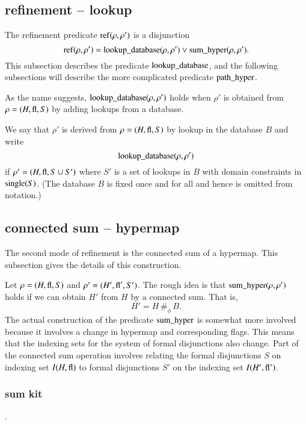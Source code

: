 \subsection{refinement -- lookup}
%
\label{sec:refine}

The refinement predicate ${\operatorname{ref}}(\rho,\rho')$ is a disjunction
    \begin{equation}
    {\operatorname{ref}}(\rho,\rho') =
    {\operatorname{lookup\_database}}(\rho,\rho')\vee
    {\operatorname{sum\_hyper}}(\rho,\rho').
    \end{equation}
This subsection describes the predicate ${\operatorname{lookup\_database}}$,
and the following subsections  will describe the more complicated
predicate ${\operatorname{path\_hyper}}$.

As the name suggests, ${\operatorname{lookup\_database}}(\rho,\rho')$ holds
when $\rho'$ is obtained from $\rho=(H,{\operatorname{fl}},S)$ by adding
lookups from a database.

\begin{definition}
We say that $\rho'$ is derived from $\rho=(H,{\operatorname{fl}},S)$ by lookup
in the database $B$ and write
    $${\operatorname{lookup\_database}}(\rho,\rho')$$
if $\rho' = (H,{\operatorname{fl}},S \cup S')$ where $S'$ is a set of lookups
in $B$ with domain constraints in ${\operatorname{single}}(S)$. (The database
$B$ is fixed once and for all and hence is omitted from notation.)
\end{definition}

\subsection{connected sum -- hypermap}

The second mode of refinement is the connected sum of a hypermap.  This
subsection gives the details of this construction.

Let $\rho=(H,{\operatorname{fl}},S)$ and $\rho'=(H',{\operatorname{fl}}',S')$.   The rough
idea is that ${\operatorname{sum\_hyper}}(\rho,\rho')$ holds if we can
obtain $H'$ from $H$ by a connected sum. That is,
    $$H' = H\,\#_\phi\, B.
    $$
The actual
construction of the predicate ${\operatorname{sum\_hyper}}$ is somewhat more
involved because it involves a change in hypermap and
corresponding flags. This means that the indexing sets for the
system of formal disjunctions also change.  Part of the connected sum
operation involves relating the formal disjunctions $S$ on
indexing set $I(H,{\operatorname{fl}})$ to formal disjunctions $S'$ on the
indexing set $I(H',{\operatorname{fl'}})$.

\subsubsection{sum kit}.



